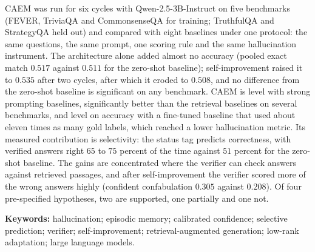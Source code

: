 CAEM was run for six cycles with Qwen-2.5-3B-Instruct on five benchmarks (FEVER, TriviaQA and CommonsenseQA for training; TruthfulQA and StrategyQA held out) and compared with eight baselines under one protocol: the same questions, the same prompt, one scoring rule and the same hallucination instrument. The architecture alone added almost no accuracy (pooled exact match $0.517$ against $0.511$ for the zero-shot baseline); self-improvement raised it to $0.535$ after two cycles, after which it eroded to $0.508$, and no difference from the zero-shot baseline is significant on any benchmark. CAEM is level with strong prompting baselines, significantly better than the retrieval baselines on several benchmarks, and level on accuracy with a fine-tuned baseline that used about eleven times as many gold labels, which reached a lower hallucination metric. Its measured contribution is selectivity: the status tag predicts correctness, with verified answers right $65$ to $75$ percent of the time against $51$ percent for the zero-shot baseline. The gains are concentrated where the verifier can check answers against retrieved passages, and after self-improvement the verifier scored more of the wrong answers highly (confident confabulation $0.305$ against $0.208$). Of four pre-specified hypotheses, two are supported, one partially and one not.

\vspace{0.5cm}
\noindent\textbf{Keywords:} hallucination; episodic memory; calibrated confidence; selective prediction; verifier; self-improvement; retrieval-augmented generation; low-rank adaptation; large language models.
\pagebreak
